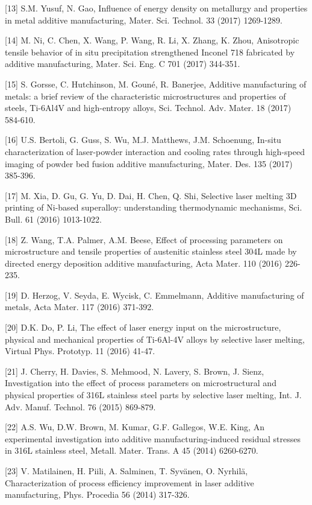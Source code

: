 \documentclass[10pt]{article}
\begin{document}
[13] S.M. Yusuf, N. Gao, Influence of energy density on metallurgy and properties in metal additive manufacturing, Mater. Sci. Technol. 33 (2017) 1269-1289.

[14] M. Ni, C. Chen, X. Wang, P. Wang, R. Li, X. Zhang, K. Zhou, Anisotropic tensile behavior of in situ precipitation strengthened Inconel 718 fabricated by additive manufacturing, Mater. Sci. Eng. C 701 (2017) 344-351.

[15] S. Gorsse, C. Hutchinson, M. Gouné, R. Banerjee, Additive manufacturing of metals: a brief review of the characteristic microstructures and properties of steels, Ti-6Al4V and high-entropy alloys, Sci. Technol. Adv. Mater. 18 (2017) 584-610.

[16] U.S. Bertoli, G. Guss, S. Wu, M.J. Matthews, J.M. Schoenung, In-situ characterization of laser-powder interaction and cooling rates through high-speed imaging of powder bed fusion additive manufacturing, Mater. Des. 135 (2017) 385-396.

[17] M. Xia, D. Gu, G. Yu, D. Dai, H. Chen, Q. Shi, Selective laser melting 3D printing of Ni-based superalloy: understanding thermodynamic mechanisms, Sci. Bull. 61 (2016) 1013-1022.

[18] Z. Wang, T.A. Palmer, A.M. Beese, Effect of processing parameters on microstructure and tensile properties of austenitic stainless steel 304L made by directed energy deposition additive manufacturing, Acta Mater. 110 (2016) 226-235.

[19] D. Herzog, V. Seyda, E. Wycisk, C. Emmelmann, Additive manufacturing of metals, Acta Mater. 117 (2016) 371-392.

[20] D.K. Do, P. Li, The effect of laser energy input on the microstructure, physical and mechanical properties of Ti-6Al-4V alloys by selective laser melting, Virtual Phys. Prototyp. 11 (2016) 41-47.

[21] J. Cherry, H. Davies, S. Mehmood, N. Lavery, S. Brown, J. Sienz, Investigation into the effect of process parameters on microstructural and physical properties of 316L stainless steel parts by selective laser melting, Int. J. Adv. Manuf. Technol. 76 (2015) 869-879.

[22] A.S. Wu, D.W. Brown, M. Kumar, G.F. Gallegos, W.E. King, An experimental investigation into additive manufacturing-induced residual stresses in 316L stainless steel, Metall. Mater. Trans. A 45 (2014) 6260-6270.

[23] V. Matilainen, H. Piili, A. Salminen, T. Syvänen, O. Nyrhilä, Characterization of process efficiency improvement in laser additive manufacturing, Phys. Procedia 56 (2014) 317-326.
\end{document}
